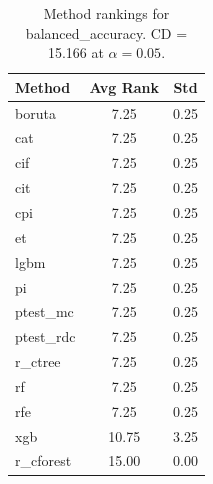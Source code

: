 \begin{table}[h]
\centering
\caption{Method rankings for balanced_accuracy. CD = 15.166 at $\alpha=0.05$.}
\label{tab:ranks_balanced_accuracy}
\begin{tabular}{lcc}
\toprule
Method & Avg Rank & Std \\
\midrule
boruta & 7.25 & 0.25 \\
cat & 7.25 & 0.25 \\
cif & 7.25 & 0.25 \\
cit & 7.25 & 0.25 \\
cpi & 7.25 & 0.25 \\
et & 7.25 & 0.25 \\
lgbm & 7.25 & 0.25 \\
pi & 7.25 & 0.25 \\
ptest_mc & 7.25 & 0.25 \\
ptest_rdc & 7.25 & 0.25 \\
r_ctree & 7.25 & 0.25 \\
rf & 7.25 & 0.25 \\
rfe & 7.25 & 0.25 \\
xgb & 10.75 & 3.25 \\
r_cforest & 15.00 & 0.00 \\
\bottomrule
\end{tabular}
\end{table}